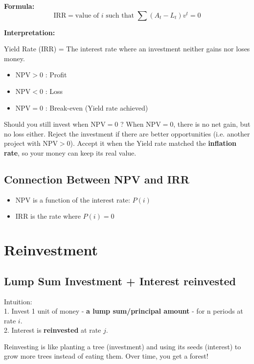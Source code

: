 \textbf{Formula:}
\[
\text{IRR} = \text{value of } i \text{ such that } \sum (A_t - L_t) v^t = 0
\]

\textbf{Interpretation:}
\begin{comments}
Yield Rate (IRR) = The interest rate where an investment neither gains nor loses money. 
\begin{itemize}
    \item $\text{NPV} > 0$ : Profit
    \item $\text{NPV} < 0$ : Loss
    \item $\text{NPV} = 0$ : Break-even (Yield rate achieved)
\end{itemize}

Should you still invest when  $\text{NPV} = 0$ ? When  $\text{NPV} = 0$, there is no net gain, but no loss either. Reject the investment if there are better opportunities (i.e. another project with  $\text{NPV} > 0$). Accept it when the Yield rate matched the \textbf{inflation rate}, so your money can keep its real value. 
\end{comments}

\subsection*{Connection Between NPV and IRR}

\begin{itemize}
    \item NPV is a function of the interest rate: $P(i)$
    \item IRR is the rate where $P(i) = 0$
\end{itemize}


\section{Reinvestment}

\subsection{Lump Sum Investment + Interest reinvested}
\begin{definition}
    Intuition: \\
    1. Invest 1 unit of money - \textbf{a lump sum/principal amount} - for n periods at rate $i$. \\
    2. Interest is \textbf{reinvested} at rate $j$. 
\end{definition}

\begin{comments}
    Reinvesting is like planting a tree (investment) and using its seeds (interest) to grow more trees instead of eating them. Over time, you get a forest! 
\end{comments}

